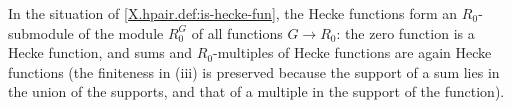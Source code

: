 In the situation of \cref{X.hpair.def:is-hecke-fun}, the Hecke functions form an $R_0$-submodule of the module $R_0^G$ of all functions $G\to R_0$: the zero function is a Hecke function, and sums and $R_0$-multiples of Hecke functions are again Hecke functions (the finiteness in (iii) is preserved because the support of a sum lies in the union of the supports, and that of a multiple in the support of the function).
